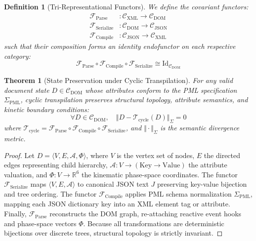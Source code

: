 \documentclass[10pt,twocolumn,letterpaper]{article}
\newtheorem{theorem}{Theorem}
\newtheorem{definition}{Definition}
\begin{document}
\begin{definition}[Tri-Representational Functors]
We define the covariant functors:
\begin{align}
    \mathcal{F}_{\mathrm{Parse}} &: \mathcal{C}_{\mathrm{XML}} \longrightarrow \mathcal{C}_{\mathrm{DOM}} \\
    \mathcal{F}_{\mathrm{Serialize}} &: \mathcal{C}_{\mathrm{DOM}} \longrightarrow \mathcal{C}_{\mathrm{JSON}} \\
    \mathcal{F}_{\mathrm{Compile}} &: \mathcal{C}_{\mathrm{JSON}} \longrightarrow \mathcal{C}_{\mathrm{XML}}
\end{align}
such that their composition forms an identity endofunctor on each respective category:
\begin{equation}
    \mathcal{F}_{\mathrm{Parse}} \circ \mathcal{F}_{\mathrm{Compile}} \circ \mathcal{F}_{\mathrm{Serialize}} \cong \mathrm{Id}_{\mathcal{C}_{\mathrm{DOM}}}
\end{equation}
\end{definition}

\begin{theorem}[State Preservation under Cyclic Transpilation]
For any valid document state $D \in \mathcal{C}_{\mathrm{DOM}}$ whose attributes conform to the PML specification $\Sigma_{\mathrm{PML}}$, cyclic transpilation preserves structural topology, attribute semantics, and kinetic boundary conditions:
\begin{equation}
    \forall D \in \mathcal{C}_{\mathrm{DOM}}, \quad \Vert D - \mathcal{T}_{\mathrm{cycle}}(D) \Vert_{\Sigma} = 0
\end{equation}
where $\mathcal{T}_{\mathrm{cycle}} = \mathcal{F}_{\mathrm{Parse}} \circ \mathcal{F}_{\mathrm{Compile}} \circ \mathcal{F}_{\mathrm{Serialize}}$, and $\Vert \cdot \Vert_{\Sigma}$ is the semantic divergence metric.
\end{theorem}

\begin{proof}
Let $D = \langle V, E, \mathcal{A}, \Phi \rangle$, where $V$ is the vertex set of nodes, $E$ the directed edges representing child hierarchy, $\mathcal{A}: V \to (\mathrm{Key} \to \mathrm{Value})$ the attribute valuation, and $\Phi: V \to \mathbb{R}^6$ the kinematic phase-space coordinates. The functor $\mathcal{F}_{\mathrm{Serialize}}$ maps $\langle V, E, \mathcal{A} \rangle$ to canonical JSON text $J$ preserving key-value bijection and tree ordering. The functor $\mathcal{F}_{\mathrm{Compile}}$ applies PML schema normalization $\Sigma_{\mathrm{PML}}$, mapping each JSON dictionary key into an XML element tag or attribute. Finally, $\mathcal{F}_{\mathrm{Parse}}$ reconstructs the DOM graph, re-attaching reactive event hooks and phase-space vectors $\Phi$. Because all transformations are deterministic bijections over discrete trees, structural topology is strictly invariant.
\end{proof}
\end{document}
